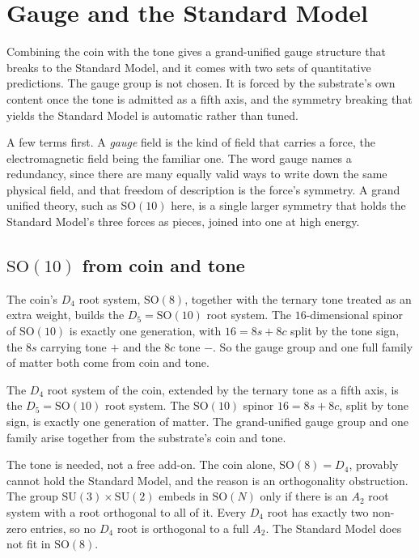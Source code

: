 \section{Gauge and the Standard Model}

Combining the coin with the tone gives a grand-unified gauge structure that breaks to the Standard Model, and it
comes with two sets of quantitative predictions. The gauge group is not chosen. It is forced by the substrate's
own content once the tone is admitted as a fifth axis, and the symmetry breaking that yields the Standard Model
is automatic rather than tuned.

A few terms first. A \emph{gauge} field is the kind of field that carries a force, the electromagnetic field
being the familiar one. The word gauge names a redundancy, since there are many equally valid ways to write down
the same physical field, and that freedom of description is the force's symmetry. A grand unified theory, such as
$\mathrm{SO}(10)$ here, is a single larger symmetry that holds the Standard Model's three forces as pieces,
joined into one at high energy.

\subsection{$\mathrm{SO}(10)$ from coin and tone}

The coin's $D_4$ root system, $\mathrm{SO}(8)$, together with the ternary tone treated as an extra weight, builds
the $D_5 = \mathrm{SO}(10)$ root system. The $16$-dimensional spinor of $\mathrm{SO}(10)$ is exactly one
generation, with $16 = 8s + 8c$ split by the tone sign, the $8s$ carrying tone $+$ and the $8c$ tone $-$. So the
gauge group and one full family of matter both come from coin and tone.

\begin{theorem}
The $D_4$ root system of the coin, extended by the ternary tone as a fifth axis, is the $D_5 = \mathrm{SO}(10)$
root system. The $\mathrm{SO}(10)$ spinor $16 = 8s + 8c$, split by tone sign, is exactly one generation of
matter. The grand-unified gauge group and one family arise together from the substrate's coin and tone.
\end{theorem}

The tone is needed, not a free add-on. The coin alone, $\mathrm{SO}(8) = D_4$, provably cannot hold the Standard
Model, and the reason is an orthogonality obstruction. The group $\mathrm{SU}(3) \times \mathrm{SU}(2)$ embeds in
$\mathrm{SO}(N)$ only if there is an $A_2$ root system with a root orthogonal to all of it. Every $D_4$ root has
exactly two non-zero entries, so no $D_4$ root is orthogonal to a full $A_2$. The Standard Model does not fit in
$\mathrm{SO}(8)$.

